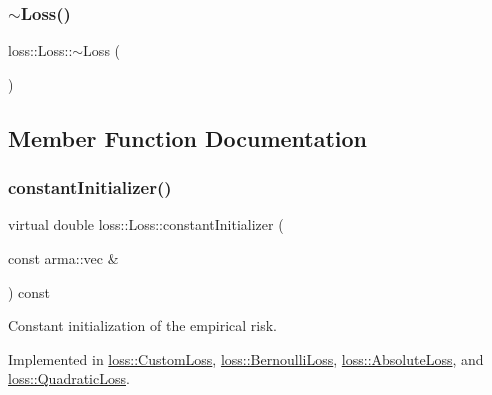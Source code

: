 \subsubsection{\texorpdfstring{$\sim$\+Loss()}{~Loss()}}
{\footnotesize\ttfamily loss\+::\+Loss\+::$\sim$\+Loss (\begin{DoxyParamCaption}{ }\end{DoxyParamCaption})\hspace{0.3cm}{\ttfamily [virtual]}}



\subsection{Member Function Documentation}
\mbox{\label{classloss_1_1_loss_a65fe7dcd9370e6a549b8d1cc95fc8798}} 
\subsubsection{\texorpdfstring{constant\+Initializer()}{constantInitializer()}}
{\footnotesize\ttfamily virtual double loss\+::\+Loss\+::constant\+Initializer (\begin{DoxyParamCaption}\item[{const arma\+::vec \&}]{ }\end{DoxyParamCaption}) const\hspace{0.3cm}{\ttfamily [pure virtual]}}



Constant initialization of the empirical risk. 



Implemented in \mbox{\hyperlink{classloss_1_1_custom_loss_adf283025a8511731504cd5b620cc8b37}{loss\+::\+Custom\+Loss}}, \mbox{\hyperlink{classloss_1_1_bernoulli_loss_a1b5e26f446f30d690abc625349f563d1}{loss\+::\+Bernoulli\+Loss}}, \mbox{\hyperlink{classloss_1_1_absolute_loss_aa2ac5fb1fdf3ce0f48decd77d375ef76}{loss\+::\+Absolute\+Loss}}, and \mbox{\hyperlink{classloss_1_1_quadratic_loss_a43989f3fbecc27351513afe1136cdf38}{loss\+::\+Quadratic\+Loss}}.


